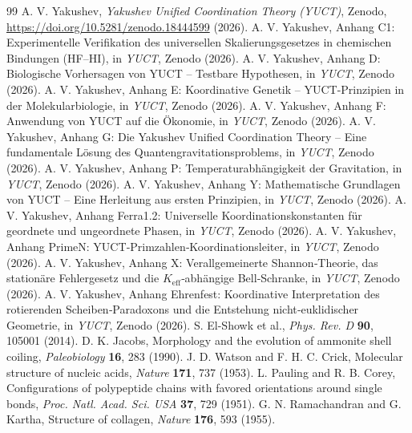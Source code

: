 \documentclass[12pt]{article}
\begin{document}
	\begin{thebibliography}{99}
		A. V. Yakushev, \emph{Yakushev Unified Coordination Theory (YUCT)}, Zenodo, \url{https://doi.org/10.5281/zenodo.18444599} (2026).
		A. V. Yakushev, Anhang C1: Experimentelle Verifikation des universellen Skalierungsgesetzes in chemischen Bindungen (HF–HI), in \emph{YUCT}, Zenodo (2026).
		A. V. Yakushev, Anhang D: Biologische Vorhersagen von YUCT – Testbare Hypothesen, in \emph{YUCT}, Zenodo (2026).
		A. V. Yakushev, Anhang E: Koordinative Genetik – YUCT-Prinzipien in der Molekularbiologie, in \emph{YUCT}, Zenodo (2026).
		A. V. Yakushev, Anhang F: Anwendung von YUCT auf die Ökonomie, in \emph{YUCT}, Zenodo (2026).
		A. V. Yakushev, Anhang G: Die Yakushev Unified Coordination Theory – Eine fundamentale Lösung des Quantengravitationsproblems, in \emph{YUCT}, Zenodo (2026).
		A. V. Yakushev, Anhang P: Temperaturabhängigkeit der Gravitation, in \emph{YUCT}, Zenodo (2026).
		A. V. Yakushev, Anhang Y: Mathematische Grundlagen von YUCT – Eine Herleitung aus ersten Prinzipien, in \emph{YUCT}, Zenodo (2026).
		A. V. Yakushev, Anhang Ferra1.2: Universelle Koordinationskonstanten für geordnete und ungeordnete Phasen, in \emph{YUCT}, Zenodo (2026).
		A. V. Yakushev, Anhang PrimeN: YUCT‑Primzahlen‑Koordinationsleiter, in \emph{YUCT}, Zenodo (2026).
		A. V. Yakushev, Anhang X: Verallgemeinerte Shannon‑Theorie, das stationäre Fehlergesetz und die \(K_{\mathrm{eff}}\)‑abhängige Bell‑Schranke, in \emph{YUCT}, Zenodo (2026).
		A. V. Yakushev, Anhang Ehrenfest: Koordinative Interpretation des rotierenden Scheiben‑Paradoxons und die Entstehung nicht‑euklidischer Geometrie, in \emph{YUCT}, Zenodo (2026).
		S. El-Showk et al., \emph{Phys. Rev. D} \textbf{90}, 105001 (2014).
		D. K. Jacobs, Morphology and the evolution of ammonite shell coiling, \emph{Paleobiology} \textbf{16}, 283 (1990).
		J. D. Watson and F. H. C. Crick, Molecular structure of nucleic acids, \emph{Nature} \textbf{171}, 737 (1953).
		L. Pauling and R. B. Corey, Configurations of polypeptide chains with favored orientations around single bonds, \emph{Proc. Natl. Acad. Sci. USA} \textbf{37}, 729 (1951).
		G. N. Ramachandran and G. Kartha, Structure of collagen, \emph{Nature} \textbf{176}, 593 (1955).

\end{thebibliography}
\end{document}

